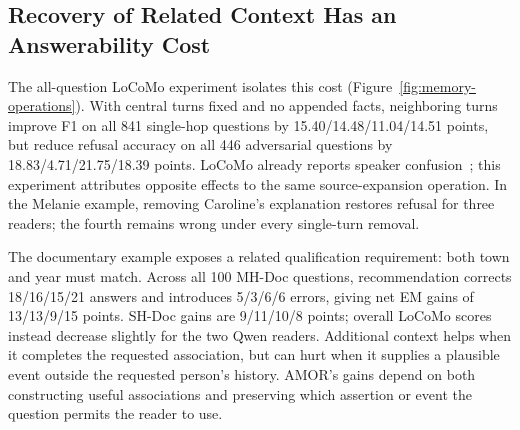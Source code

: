 \subsection{Recovery of Related Context Has an Answerability Cost}

The all-question LoCoMo experiment isolates this cost (Figure~\ref{fig:memory-operations}).
With central turns fixed and no appended facts, neighboring turns improve F1 on all 841 single-hop questions by 15.40/14.48/11.04/14.51 points, but reduce refusal accuracy on all 446 adversarial questions by 18.83/4.71/21.75/18.39 points.
LoCoMo already reports speaker confusion~\citep{maharana-etal-2024-evaluating}; this experiment attributes opposite effects to the same source-expansion operation.
In the Melanie example, removing Caroline's explanation restores refusal for three readers; the fourth remains wrong under every single-turn removal.

The documentary example exposes a related qualification requirement: both town and year must match.
Across all 100 MH-Doc questions, recommendation corrects 18/16/15/21 answers and introduces 5/3/6/6 errors, giving net EM gains of 13/13/9/15 points.
SH-Doc gains are 9/11/10/8 points; overall LoCoMo scores instead decrease slightly for the two Qwen readers.
Additional context helps when it completes the requested association, but can hurt when it supplies a plausible event outside the requested person's history.
AMOR's gains depend on both constructing useful associations and preserving which assertion or event the question permits the reader to use.
